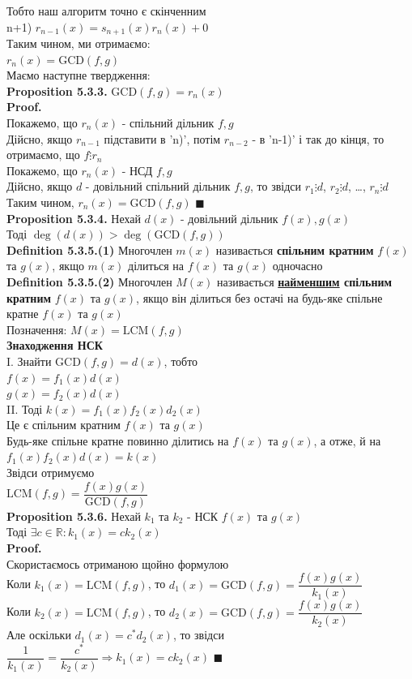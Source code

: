 \documentclass[a4paper, 14pt]{extarticle}
\def\defin#1{\textbf{Definition {#1}}}
\def\prp#1{\textbf{Proposition {#1}}}
\def\proof{\textbf{Proof.}\\}
\def\bigline{\vspace{5mm}\\}
\def\qed{$\blacksquare$}
\begin{document}
Тобто наш алгоритм точно є скінченним\\
n+1) $r_{n-1}(x) = s_{n+1}(x)r_n(x) + 0$\\
Таким чином, ми отримаємо:\\
$r_n(x) = \textrm{GCD}(f,g)$\\
Маємо наступне твердження:\\
\prp{5.3.3.} $\textrm{GCD}(f,g) = r_n(x)$\\
\proof
Покажемо, що $r_n(x)$ - спільний дільник $f,g$\\
Дійсно, якщо $r_{n-1}$ підставити в 'n)', потім $r_{n-2}$ - в 'n-1)' і так до кінця, то отримаємо, що $f \vdots r_{n}$\\
Покажемо, що $r_n(x)$ - НСД $f,g$\\
Дійсно, якщо $d$ - довільний спільний дільник $f,g$, то звідси $r_1 \vdots d$, $r_2 \vdots d$, \dots, $r_n \vdots d$\\
Таким чином, $r_n(x) = \textrm{GCD}(f,g)$ \qed
\bigline
\prp{5.3.4.} Нехай $d(x)$ - довільний дільник $f(x),g(x)$\\
Тоді $\deg(d(x)) > \deg(\textrm{GCD}(f,g))$
\bigline
\defin{5.3.5.(1)} Многочлен $m(x)$ називається \textbf{спільним кратним} $f(x)$ та $g(x)$, якщо $m(x)$ ділиться на $f(x)$ та $g(x)$ одночасно
\bigline
\defin{5.3.5.(2)} Многочлен $M(x)$ називається \textbf{\underline{найменшим} спільним кратним} $f(x)$ та $g(x)$, якщо він ділиться без остачі на будь-яке спільне кратне $f(x)$ та $g(x)$\\
Позначення: $M(x) = \textrm{LCM}(f,g)$
\bigline
\textbf{Знаходження НСК}\\
I. Знайти $\textrm{GCD}(f,g) = d(x)$, тобто\\
$f(x) = f_1(x) d(x)$\\
$g(x) = f_2(x) d(x)$\\
II. Тоді $k(x) = f_1(x)f_2(x)d_2(x)$\\
Це є спільним кратним $f(x)$ та $g(x)$\\
Будь-яке спільне кратне повинно ділитись на $f(x)$ та $g(x)$, а отже, й на $f_1(x)f_2(x)d(x) = k(x)$\\
Звідси отримуємо\\
$\textrm{LCM}(f,g) = \dfrac{f(x)g(x)}{\textrm{GCD}(f,g)}$
\bigline
\prp{5.3.6.} Нехай $k_1$ та $k_2$ - НСК $f(x)$ та $g(x)$\\
Тоді $\exists c \in \mathbb{R}: k_1(x) = ck_2(x)$\\
\proof
Скористаємось отриманою щойно формулою\\
Коли $k_1(x) = \textrm{LCM}(f,g)$, то $d_1(x) = \textrm{GCD}(f,g) = \dfrac{f(x)g(x)}{k_1(x)}$\\
Коли $k_2(x) = \textrm{LCM}(f,g)$, то $d_2(x) = \textrm{GCD}(f,g) = \dfrac{f(x)g(x)}{k_2(x)}$\\
Але оскільки $d_1(x) = c^*d_2(x)$, то звідси $\dfrac{1}{k_1(x)} = \dfrac{c^*}{k_2(x)} \Rightarrow k_1(x) = c k_2(x)$ \qed
\bigline
\end{document}
